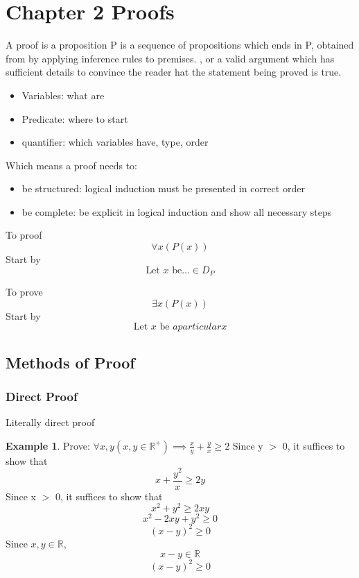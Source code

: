 \documentclass[14pt]{article}
\theoremstyle{definition}
\newtheorem*{example}{Example}
\begin{document}
\section{Chapter 2 Proofs}
A proof is a proposition P is a sequence of propositions which ends in P, obtained from by applying inference rules to premises.
, or a valid argument which has sufficient details to convince the reader hat the statement being proved is true.

\begin{itemize}
    \item Variables: what are
    \item Predicate: where to start
    \item quantifier: which variables have, type, order
\end{itemize}

Which means a proof needs to: 
\begin{itemize}
    \item be structured: logical induction must be presented in correct order
    \item be complete: be explicit in logical induction and show all necessary steps
\end{itemize}

To proof
\[\forall x(P(x))\]
Start by 
\[ \text{Let } x \text{ be} ... \in D_P\]

To prove 
\[\exists x(P(x))\]
Start by 
\[\text{Let } x \text{ be } a particular x\]

\subsection*{Methods of Proof}
\subsubsection{Direct Proof}
Literally direct proof
\begin{example}
    Prove: \(\forall x, y(x, y \in \mathbb{R}^+) \implies \frac{x}{y} + \frac{y}{x} \geq 2\) \newline
    Since y \(>\) 0, it suffices to show that
    \[x + \frac{y^2}{x} \geq 2y\]
    Since x \(>\) 0, it suffices to show that
    \[x^2 + y^2 \geq 2xy\]
    \[x^2 -2xy + y^2 \geq 0\]
    \[(x - y)^2 \geq 0\]
    Since \(x, y \in \mathbb{R}\),
    \[x - y \in \mathbb{R}\]
    \[(x - y)^2 \geq 0\]
\end{example}
\subsubsection{}
\end{document}

